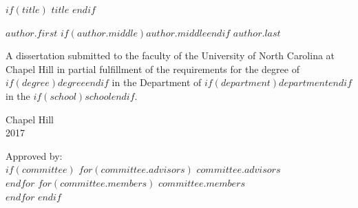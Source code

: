 \documentclass[$if(fontsize)$$fontsize$,$endif$,letterpaper,twoside]{report}
\begin{document}

\begin{titlepage}
\begin{center}


\vspace{2in}
\begin{singlespace}
$if(title)$
$title$
$endif$
\end{singlespace}


\vspace{61pt} %
$author.first$ $if(author.middle)$$author.middle$$endif$ $author.last$
\end{center}

\vspace{50pt}
\begin{singlespace}
\begin{center}
\noindent 
A dissertation submitted to the faculty of the University of North Carolina at Chapel Hill in partial fulfillment of the requirements for the degree of $if(degree)$$degree$$endif$ in the Department of $if(department)$$department$$endif$ in the $if(school)$$school$$endif$.
\end{center}
\end{singlespace}


\vspace{50pt}
\begin{center}
\begin{singlespace} 
Chapel Hill\\
2017
\end{singlespace}
\end{center}

 

\vfill
\begin{flushright}
\begin{minipage}[t]{1.5in} 
Approved by:\\
$if(committee)$ 
$for(committee.advisors)$ $committee.advisors$ \\ $endfor$
$for(committee.members)$ $committee.members$ \\ $endfor$
$endif$
\end{minipage}
\end{flushright}

\end{titlepage}
\end{document}
